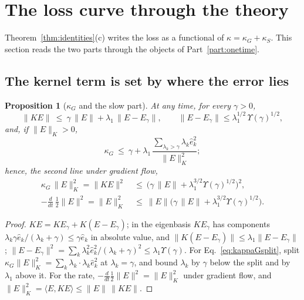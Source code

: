 \documentclass[11pt]{article}
\newtheorem{proposition}{Proposition}
\theoremstyle{definition}
\theoremstyle{remark}
\newcommand{\ip}[2]{\langle #1,#2\rangle}
\begin{document}
\section{The loss curve through the theory}\label{sec:loss}

Theorem~\ref{thm:identities}(c) writes the loss as a functional of $\kappa = \kappa_G + \kappa_S$.
This section reads the two parts through the objects of Part~\ref{part:onetime}.

\subsection{The kernel term is set by where the error lies}

\begin{proposition}[$\kappa_G$ and the slow part]\label{prop:kappaG}
At any time, for every $\gamma > 0$,
\begin{equation}\label{eq:KEsplit}
\|KE\|\ \le\ \gamma\,\|E\| + \lambda_1\,\|E - E_\gamma\|,\qquad \|E - E_\gamma\|\le\lambda_1^{1/2}\,\Upsilon(\gamma)^{1/2},
\end{equation}
and, if $\|E\|_K > 0$,
\begin{equation}\label{eq:kappaGsplit}
\kappa_G\ \le\ \gamma + \lambda_1\,\frac{\sum_{\lambda_k>\gamma}\lambda_k\hat e_k^2}{\|E\|_K^2};
\end{equation}
hence, the second line under gradient flow,
\begin{equation}\label{eq:rateslow}
\begin{aligned}
\kappa_G\,\|E\|_K^2 = \|KE\|^2\ &\le\ \big(\gamma\,\|E\| + \lambda_1^{3/2}\Upsilon(\gamma)^{1/2}\big)^2,\\
-\frac{d}{dt}\,\tfrac12\|E\|^2 = \|E\|_K^2\ &\le\ \|E\|\big(\gamma\,\|E\| + \lambda_1^{3/2}\Upsilon(\gamma)^{1/2}\big).
\end{aligned}
\end{equation}
\end{proposition}

\begin{proof}
$KE = KE_\gamma + K(E - E_\gamma)$; in the eigenbasis $KE_\gamma$ has components $\lambda_k\gamma\hat e_k/(\lambda_k + \gamma)\le\gamma\hat e_k$ in absolute value, and $\|K(E - E_\gamma)\|\le\lambda_1\|E - E_\gamma\|$; $\|E - E_\gamma\|^2 = \sum_k\lambda_k^2\hat e_k^2/(\lambda_k + \gamma)^2\le\lambda_1\Upsilon(\gamma)$.
For Eq.~\eqref{eq:kappaGsplit}, split $\kappa_G\|E\|_K^2 = \sum_k\lambda_k\cdot\lambda_k\hat e_k^2$ at $\lambda_k = \gamma$, and bound $\lambda_k$ by $\gamma$ below the split and by $\lambda_1$ above it.
For the rate, $-\frac{d}{dt}\frac12\|E\|^2 = \|E\|_K^2$ under gradient flow, and $\|E\|_K^2 = \ip{E}{KE}\le\|E\|\,\|KE\|$.
\end{proof}
\end{document}
